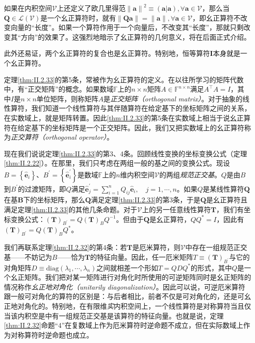 \documentclass[main.tex]{subfiles}
\begin{document}
如果在内积空间$\mathcal{V}$上还定义了欧几里得范$\left\|\mathbf{a}\right\|^2\equiv\left(\mathbf{a}|\mathbf{a}\right),\forall\mathbf{a}\in\mathcal{V}$，那么当$\mathbf{Q}\in\mathcal{L}\left(\mathcal{V}\right)$是一个幺正算符时，就有$\left\|\mathbf{Qa}\right\|=\left\|\mathbf{a}\right\|,\forall\mathbf{a}\in\mathcal{V}$，即幺正算符不改变向量的“长度”。如果一个算符作用于一个向量后，不改变其“长度”，那就只剩改变其“方向”的效果了。这强烈地暗示了幺正算符的几何意义，将在后面正式介绍。

此外还易证，两个幺正算符的复合也是幺正算符。特别地，恒等算符$\mathbf{I}$本身就是一个幺正算符。

定理\ref{thm:II.2.33}的第5条，常被作为幺正算符的定义。在以往所学习的矩阵代数中，有“正交矩阵”的概念。如果数域$\mathbb{F}$上的$n\times n$矩阵$A\in\mathbb{F}^{n\times n}$满足$A^\intercal A=I$，其中$I$是$n\times n$单位矩阵，则称矩阵$A$是\emph{正交矩阵（orthogonal matrix）}。对于抽象的线性算符，我们知道一个线性算符与其伴随算符在给定基下的坐标矩阵之间的关系，在实数域上，就是矩阵转置。因此\ref{thm:II.2.33}的第5条在实数域上相当于说幺正算符在给定基下的坐标矩阵是一个正交矩阵。因此，我们又把实数域上的幺正算符称为\emph{正交算符（orthogonal operator）}。

现在我们说说定理\ref{thm:II.2.33}的第3、4条。回顾线性变换的坐标变换公式（定理\ref{thm:II.2.22}）。在那里，我们只考虑在两组一般的基之间的变换公式。现设$B=\left\{\mathbf{\hat{e}}_i\right\}$、$B^\prime=\left\{\mathbf{\hat{e}}^\prime_i\right\}$是数域$\mathbb{F}$上的$n$维内积空间$\mathcal{V}$的两组\emph{规范正交基}。$Q$是由$B$到$B^\prime$的过渡矩阵，即$Q$满足$\mathbf{\hat{e}}^\prime_j=\sum_{i=1}^nQ_{ij}\mathbf{\hat{e}}_i,\quad j=1,\cdots,n$。如果$Q$是某线性算符$\mathbf{Q}$在基$\mathbf{B}$下的坐标矩阵，那么$\mathbf{Q}$满足定理\ref{thm:II.2.33}的第3条，于是$\mathbf{Q}$是幺正算符且满足定理\ref{thm:II.2.33}的其他几条命题。对于$\mathcal{V}$上的另一任意线性算符$\mathbf{T}$，我们有坐标变换公式：$\left(\mathbf{T}\right)_{B^\prime}=Q\left(\mathbf{T}\right)_{B}Q^{-1}$。但由于$\mathbf{Q}$是幺正算符，$QQ^*=I$，因此有$\left(\mathbf{T}\right)_{B^\prime}=Q\left(\mathbf{T}\right)_{B}Q^*$。

我们再联系定理\ref{thm:II.2.32}的第4条：若$\mathbf{T}$是厄米算符，则$\mathcal{V}$中存在一组规范正交基——不妨记为$B$——恰为$\mathbf{T}$的特征向量。因此，任一厄米矩阵$T\equiv\left(\mathbf{T}\right)_{B^\prime}$与它的对角矩阵$D\equiv\mathrm{diag}\left(\lambda_1,\cdots,\lambda_n\right)$之间就相差一个形如$T=QDQ^*$的形式，其中$Q$是一个幺正矩阵\cite[\S 5.3 定理3.6]{周胜林2012线性代数}。我们把对某一矩阵进行对角化时所使用的可逆矩阵同时是幺正矩阵的情况称作\emph{幺正地对角化（unitarily diagonalization）}。因此可以说，可逆厄米算符跟一般可对角化的算符的区别是：与后者相比，前者不仅是可对角化的，还是可幺正地对角化的。特别地，在有限维\emph{实}内积空间上，一个线性算符是对称算符当且仅当该内积空是中有一组规范正交基是该算符的特征向量。也就是说，定理\ref{thm:II.2.32}命题“4”在复数域上作为厄米算符时逆命题不成立，但在实际数域上作为对称算符时逆命题也成立。
\end{document}

